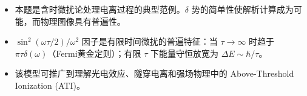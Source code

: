 \begin{insightbox}[物理图像]
\begin{itemize}
    \item 本题是含时微扰论处理电离过程的典型范例。$\delta$ 势的简单性使解析计算成为可能，而物理图像具有普遍性。
    \item $\sin^2(\omega\tau/2)/\omega^2$ 因子是有限时间微扰的普遍特征：当 $\tau\to\infty$ 时趋于 $\pi\tau\delta(\omega)$（Fermi黄金定则）；有限 $\tau$ 下能量守恒放宽为 $\Delta E\sim\hbar/\tau$。
    \item 该模型可推广到理解光电效应、隧穿电离和强场物理中的 Above-Threshold Ionization (ATI)。
\end{itemize}
\end{insightbox}
